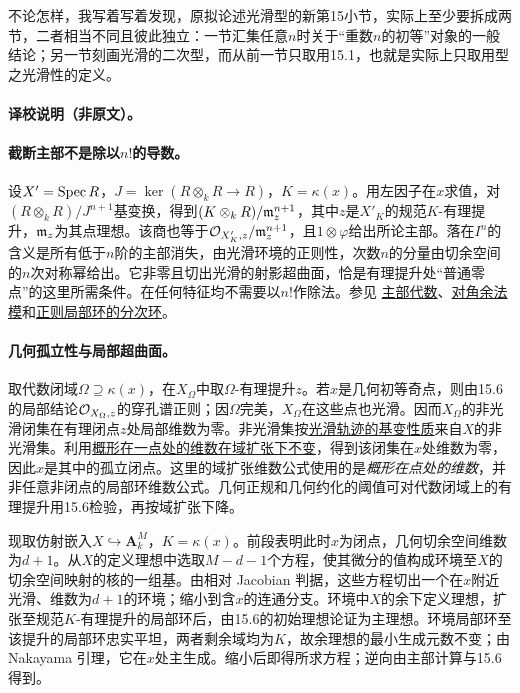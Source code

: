 不论怎样，我写着写着发现，原拟论述光滑型的新第15小节，实际上至少要拆成两节，二者相当不同且彼此独立：一节汇集任意$n$时关于“重数$n$的初等”对象的一般结论；另一节刻画光滑的二次型，而从前一节只取用15.1，也就是实际上只取用型之光滑性的定义。

\paragraph{译校说明（非原文）。}
\paragraph{截断主部不是除以$n!$的导数。}
设$X'=\operatorname{Spec} R$，$J=\ker(R\otimes_kR\to R)$，$K=\kappa(x)$。用左因子在$x$求值，对$(R\otimes_k R)/J^{n+1}$基变换，得到$(K\otimes_k R)/\mathfrak m_z^{n+1}$，其中$z$是$X'_K$的规范$K$-有理提升，$\mathfrak m_z$为其点理想。该商也等于$\mathcal O_{X'_K,z}/\mathfrak m_z^{n+1}$，且$1\otimes\varphi$给出所论主部。落在$I^n$的含义是所有低于$n$阶的主部消失，由光滑环境的正则性，次数$n$的分量由切余空间的$n$次对称幂给出。它非零且切出光滑的射影超曲面，恰是有理提升处“普通零点”的这里所需条件。在任何特征均不需要以$n!$作除法。参见 \href{https://stacks.math.columbia.edu/tag/09CH}{主部代数}、\href{https://stacks.math.columbia.edu/tag/08S2}{对角余法模}和\href{https://stacks.math.columbia.edu/tag/00NO}{正则局部环的分次环}。

\paragraph{几何孤立性与局部超曲面。}
取代数闭域$\Omega\supseteq\kappa(x)$，在$X_\Omega$中取$\Omega$-有理提升$z$。若$x$是几何初等奇点，则由15.6的局部结论$\mathcal O_{X_\Omega,z}$的穿孔谱正则；因$\Omega$完美，$X_\Omega$在这些点也光滑。因而$X_\Omega$的非光滑闭集在有理闭点$z$处局部维数为零。非光滑集按\href{https://stacks.math.columbia.edu/tag/02V4}{光滑轨迹的基变性质}来自$X$的非光滑集。利用\href{https://stacks.math.columbia.edu/tag/00P4}{概形在一点处的维数在域扩张下不变}，得到该闭集在$x$处维数为零，因此$x$是其中的孤立闭点。这里的域扩张维数公式使用的是\emph{概形在点处的维数}，并非任意非闭点的局部环维数公式。几何正规和几何约化的阈值可对代数闭域上的有理提升用15.6检验，再按域扩张下降。

现取仿射嵌入$X\hookrightarrow\mathbf A^M_k$，$K=\kappa(x)$。前段表明此时$x$为闭点，几何切余空间维数为$d+1$。从$X$的定义理想中选取$M-d-1$个方程，使其微分的值构成环境至$X$的切余空间映射的核的一组基。由相对 Jacobian 判据，这些方程切出一个在$x$附近光滑、维数为$d+1$的环境；缩小到含$x$的连通分支。环境中$X$的余下定义理想，扩张至规范$K$-有理提升的局部环后，由15.6的初始理想论证为主理想。环境局部环至该提升的局部环忠实平坦，两者剩余域均为$K$，故余理想的最小生成元数不变；由 Nakayama 引理，它在$x$处主生成。缩小后即得所求方程；逆向由主部计算与15.6得到。
